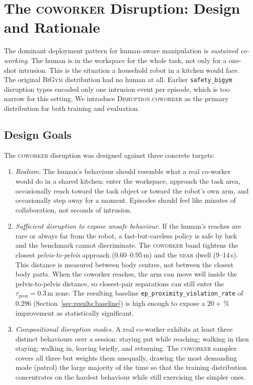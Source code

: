 \documentclass[11pt,a4paper]{report}
\newcommand{\bigym}{\textsc{BiGym}}
\newcommand{\sbigym}{\texttt{safety\_bigym}}
\newcommand{\coworker}{\textsc{coworker}}
\begin{document}
\section{The \coworker{} Disruption: Design and Rationale}
\label{sec:bench:coworker}

The dominant deployment pattern for human-aware manipulation is
\emph{sustained co-working}. The human is in the workspace for the
whole task, not only for a one-shot intrusion. This is the situation a
household robot in a kitchen would face. The original \bigym{}
distribution had no human at all. Earlier \sbigym{} disruption types
encoded only one intrusion event per episode, which is too narrow for
this setting. We introduce \textsc{Disruption.coworker} as the primary
distribution for both training and evaluation.

\subsection{Design Goals}
\label{sec:bench:coworker:design}

The \coworker{} disruption was designed against three concrete
targets:

\begin{enumerate}[topsep=2pt,itemsep=2pt]
\item \emph{Realism.} The human's behaviour should resemble what a
  real co-worker would do in a shared kitchen: enter the workspace,
  approach the task area, occasionally reach toward the task object
  or toward the robot's own arm, and occasionally step
  away for a moment. Episodes should feel like minutes of
  collaboration, not seconds of intrusion.
\item \emph{Sufficient disruption to expose unsafe behaviour.} If
  the human's reaches are rare or always far from the robot, a
  fast-but-careless policy is safe by luck and the benchmark cannot
  discriminate. The \coworker{} band tightens the closest
  \emph{pelvis-to-pelvis} approach (0.60--0.95\,m) and the
  \textsc{near} dwell (9--14\,s). This distance is measured between
  body centres, not between the closest body parts. When the coworker
  reaches, the arm can move well inside the pelvis-to-pelvis distance,
  so closest-pair separations can still enter the
  $\tau_{\mathrm{prox}} = 0.3$\,m zone. The
  resulting baseline
  \texttt{ep\_proximity\_violation\_rate} of $0.296$
  (Section~\ref{sec:results:baseline}) is high enough to expose a
  $20+\,\%$ improvement as statistically significant.
\item \emph{Compositional disruption modes.} A real co-worker
  exhibits at least three distinct behaviours over a session:
  staying put while reaching; walking in then staying; walking in,
  leaving briefly, and returning. The \coworker{} sampler covers all
  three but weights them unequally, drawing the most demanding mode
  (patrol) the large majority of the time so that the training
  distribution concentrates on the hardest behaviour while still
  exercising the simpler ones.
\end{enumerate}
\end{document}
